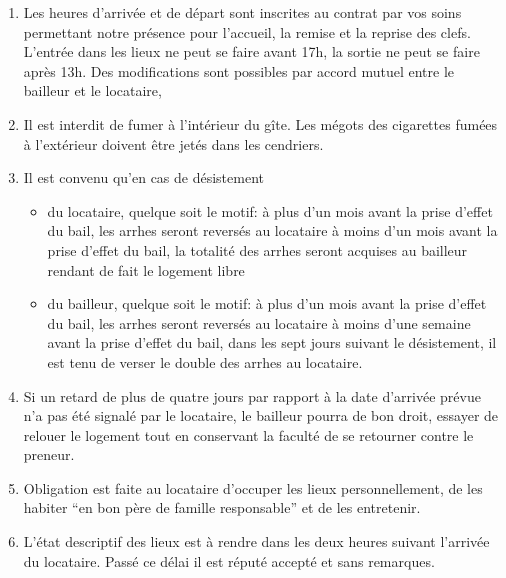\documentclass[a4paper,11pt]{article}
\begin{document}
\begin{enumerate}

\item Les heures d’arrivée et de départ sont inscrites  au contrat par vos soins permettant notre présence pour l’accueil, la remise et la reprise des clefs. L'entrée dans les lieux ne peut se faire avant 17h, la sortie ne peut se faire après 13h.
Des modifications sont possibles par accord mutuel entre le bailleur et le locataire,
 


\item Il est interdit de fumer à l’intérieur du gîte. Les mégots des cigarettes fumées à l'extérieur doivent être jetés dans les cendriers.

\item Il est convenu qu'en cas de désistement \\


\begin{itemize}
\item du locataire, quelque soit le motif:
\subitem à plus d'un mois avant la prise d'effet du bail, les arrhes seront reversés au locataire
\subitem à moins d'un mois avant la prise d'effet du bail, la totalité des arrhes seront acquises au bailleur rendant de fait le logement libre
\item du bailleur, quelque soit le motif:
\subitem à plus d'un mois avant la prise d'effet du bail, les arrhes seront reversés au locataire
\subitem à moins d'une semaine avant la prise d'effet du bail, dans les sept jours suivant le désistement, il est tenu de verser le double des arrhes au locataire.
\end{itemize}



\item Si un retard de plus de quatre jours par rapport à la date d’arrivée prévue n’a pas été signalé par le locataire, le bailleur pourra de bon droit, essayer de relouer le logement tout en conservant la faculté de se retourner contre le preneur.



\item Obligation est faite au locataire d’occuper les lieux personnellement, de les habiter “en bon père de famille responsable” et de les entretenir.

\item L'état descriptif des lieux est à rendre dans les deux heures suivant l'arrivée du locataire. Passé ce délai il est réputé accepté et sans remarques.



\end{enumerate}
\end{document}
